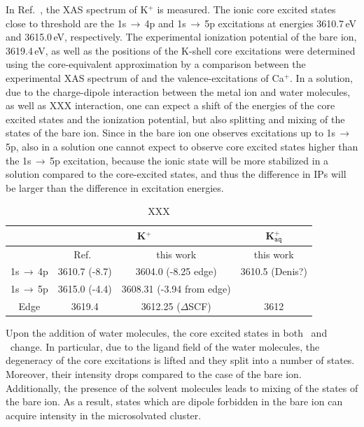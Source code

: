 In Ref.\ \citep{hertlein06:062715}, the XAS spectrum of K$^{+}$ is measured. The ionic core excited states close to threshold are the 1s$\,\rightarrow\,$4p and 1s$\,\rightarrow\,$5p excitations at energies 3610.7\,eV and 3615.0\,eV, respectively. The experimental ionization potential of the bare ion, 3619.4\,eV, as well as the positions of the K-shell core excitations were determined using the core-equivalent approximation by a comparison between the experimental XAS spectrum of \ki and the valence-excitations of Ca$^{+}$. In a solution, due to the charge-dipole interaction between the metal ion and water molecules, as well as XXX interaction, one can expect a shift of the energies of the core excited states and the ionization potential, but also splitting and mixing of the states of the bare ion. Since in the bare ion one observes excitations up to 1s$\,\rightarrow\,$5p, also in a solution one cannot expect to observe core excited states higher than the 1s$\,\rightarrow\,$5p excitation, because the ionic state will be more stabilized in a solution compared to the core-excited states, and thus the difference in IPs will be larger than the difference in excitation energies.


\begin{table}
\begin{tabular}{c c c c}
\hline\hline
& \multicolumn{2}{c}{K$^{+}$} & K$^{+}_{\texttt{aq}}$ \\
\hline
& Ref.\ \citep{hertlein06:062715} & this work & this work \\
1s$\,\rightarrow\,$4p & 3610.7 (-8.7)& 3604.0 (-8.25 edge) & 3610.5 (Denis?)\\
1s$\,\rightarrow\,$5p & 3615.0 (-4.4) & 3608.31 (-3.94 from edge) & \\
Edge & 3619.4 & 3612.25 ($\Delta$SCF) & 3612 \\
\hline
\end{tabular}
\caption{XXX}
\end{table}




Upon the addition of water molecules, the core excited states in both \ki~and \cli~change. In particular, due to the ligand field of the water molecules, the degeneracy of the core excitations is lifted and they split into a number of states. Moreover, their intensity drops compared to the case of the bare ion. Additionally, the presence of the solvent molecules leads to mixing of the states of the bare ion. As a result, states which are dipole forbidden in the bare ion can acquire intensity in the microsolvated cluster.


